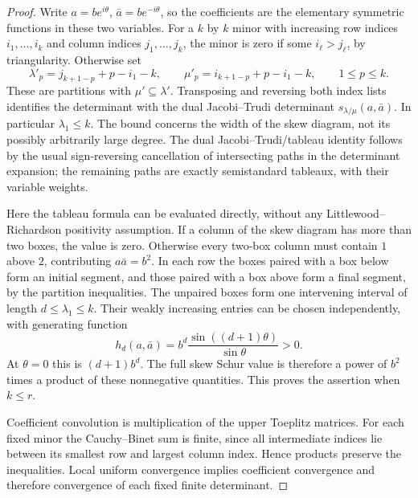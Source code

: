 \begin{proof}
Write $a=be^{i\theta}$, $\bar a=be^{-i\theta}$, so the coefficients
are the elementary symmetric functions in these two variables.
For a $k$ by $k$ minor with increasing row indices $i_1,\ldots,i_k$
and column indices $j_1,\ldots,j_k$, the minor is zero if some
$i_\ell>j_\ell$, by triangularity. Otherwise set
\[
 \lambda'_p=j_{k+1-p}+p-i_1-k,\qquad
 \mu'_p=i_{k+1-p}+p-i_1-k,\qquad 1\le p\le k.
\]
These are partitions with $\mu'\subseteq\lambda'$. Transposing
and reversing both index lists identifies the determinant with
the dual Jacobi--Trudi determinant $s_{\lambda/\mu}(a,\bar a)$.
In particular $\lambda_1\le k$. The bound concerns the width of
the skew diagram, not its possibly arbitrarily large degree.
The dual Jacobi--Trudi/tableau identity follows by the usual
sign-reversing cancellation of intersecting paths in the
determinant expansion; the remaining paths are exactly
semistandard tableaux, with their variable weights.

Here the tableau formula can be evaluated directly, without any
Littlewood--Richardson positivity assumption. If a column of the
skew diagram has more than two boxes, the value is zero. Otherwise
every two-box column must contain $1$ above $2$, contributing
$a\bar a=b^2$. In each row the boxes paired with a box below form
an initial segment, and those paired with a box above form a final
segment, by the partition inequalities. The unpaired boxes form
one intervening interval of length $d\le\lambda_1\le k$. Their
weakly increasing entries can be chosen independently, with
generating function
\[
 h_d(a,\bar a)
   =b^d\frac{\sin((d+1)\theta)}{\sin\theta}>0.
\]
At $\theta=0$ this is $(d+1)b^d$. The full skew Schur value is
therefore a power of $b^2$ times a product of these nonnegative
quantities. This proves the assertion when $k\le r$.

Coefficient convolution is multiplication of the upper Toeplitz
matrices. For each fixed minor the Cauchy--Binet sum is finite,
since all intermediate indices lie between its smallest row and
largest column index. Hence products preserve the inequalities.
Local uniform convergence implies coefficient convergence and
therefore convergence of each fixed finite determinant.
\end{proof}

